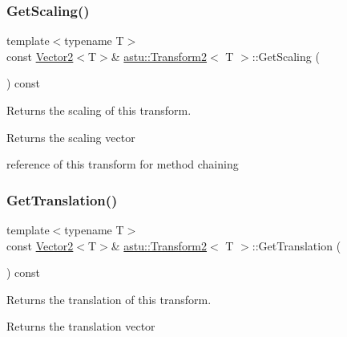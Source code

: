 \subsubsection{\texorpdfstring{Get\+Scaling()}{GetScaling()}}
{\footnotesize\ttfamily template$<$typename T$>$ \\
const \hyperlink{classastu_1_1Vector2}{Vector2}$<$T$>$\& \hyperlink{classastu_1_1Transform2}{astu\+::\+Transform2}$<$ T $>$\+::Get\+Scaling (\begin{DoxyParamCaption}{ }\end{DoxyParamCaption}) const\hspace{0.3cm}{\ttfamily [inline]}}

Returns the scaling of this transform.

\begin{DoxyReturn}{Returns}
the scaling vector 

reference of this transform for method chaining 
\end{DoxyReturn}
\mbox{\label{classastu_1_1Transform2_a9ff5447e3d4e97f788c0f99094f19e5a}} 
\subsubsection{\texorpdfstring{Get\+Translation()}{GetTranslation()}}
{\footnotesize\ttfamily template$<$typename T$>$ \\
const \hyperlink{classastu_1_1Vector2}{Vector2}$<$T$>$\& \hyperlink{classastu_1_1Transform2}{astu\+::\+Transform2}$<$ T $>$\+::Get\+Translation (\begin{DoxyParamCaption}{ }\end{DoxyParamCaption}) const\hspace{0.3cm}{\ttfamily [inline]}}

Returns the translation of this transform.

\begin{DoxyReturn}{Returns}
the translation vector 
\end{DoxyReturn}
\mbox{\label{classastu_1_1Transform2_a065f89d4c5cca423963d466566ec56ff}} 
